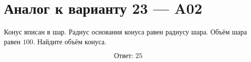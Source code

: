 \documentclass[12pt,a4paper]{article}
\begin{document}
\section*{Аналог к варианту 23 — A02}

Конус вписан в шар. Радиус основания конуса равен радиусу шара. Объём шара равен \(100\). Найдите объём конуса.

\begin{center}
\end{center}

\[
\boxed{\text{Ответ: }25}
\]
\end{document}

